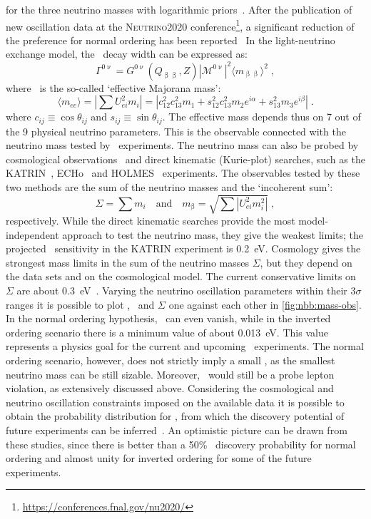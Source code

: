 for the three neutrino masses with logarithmic priors~\cite{Gariazzo2018}. After the
publication of new oscillation data at the \textsc{Neutrino2020}
conference\footnote{\url{https://conferences.fnal.gov/nu2020/}}, a significant reduction
of the preference for normal ordering has been reported~\cite{Kelly2020, Esteban2020}
\newpar
In the light-neutrino exchange model, the \onbb\ decay width can be expressed as:
\begin{equation}\label{eq:nbb:0nudecayrate}
  \Gamma^{0\upnu} = G^{0\upnu}(Q_{\upbeta\upbeta}, Z)
                  |\mathcal{M}^{0\upnu}|^2
                  \langle{m_{\upbeta\upbeta}}\rangle^2 \;,
\end{equation}
where \mbb\ is the so-called `effective Majorana mass':
\[
  \langle m_{ee} \rangle = \left| \sum U_{ei}^2 m_i \right|
                         = |c^2_{12} c^2_{13} m_1
                            + s^2_{12} c^2_{13} m_2 e^{i\alpha}
                            + s^2_{13} m_3 e^{i\beta}| \;.
\]
where $c_{ij} \equiv \cos{\theta_{ij}}$ and $s_{ij} \equiv \sin{\theta_{ij}}$.  The
effective mass depends thus on 7 out of the 9 physical neutrino parameters.  This is the
observable connected with the neutrino mass tested by \onbb\ experiments.  The neutrino
mass can also be probed by cosmological observations~\cite{Gerbino2018} and direct
kinematic (Kurie-plot) searches, such as the KATRIN~\cite{Aker2019},
ECHo~\cite{Gastaldo2018} and HOLMES~\cite{Alpert2014} experiments.  The observables tested
by these two methods are the sum of the neutrino masses and the `incoherent sum':
\[
  \Sigma = \sum m_i \quad \text{and} \quad m_{\upbeta}
         = \sqrt{\sum |U_{ei}^2 m_i^2|} \;,
\]
respectively. While the direct kinematic searches provide the most model-independent
approach to test the neutrino mass, they give the weakest limits; the projected \mb\
sensitivity in the KATRIN experiment is 0.2~eV.  Cosmology gives the strongest mass limits
in the sum of the neutrino masses $\Sigma$, but they depend on the data sets and on the
cosmological model. The current conservative limits on $\Sigma$ are about
0.3~eV~\cite{Aghanim2018}.
\newpar
Varying the neutrino oscillation parameters within their $3\sigma$ ranges it is possible
to plot \mbb, \mb\ and $\Sigma$ one against each other in \cref{fig:nbb:mass-obs}. In the
normal ordering hypothesis, \mbb\ can even vanish, while in the inverted ordering scenario
there is a minimum value of about 0.013~eV. This value represents a physics goal for the
current and upcoming \onbb\ experiments. The normal ordering scenario, however, does not
strictly imply a small \mbb, as the smallest neutrino mass can be still sizable. Moreover,
\onbb\ would still be a probe lepton violation, as extensively discussed above.
\newpar
Considering the cosmological and neutrino oscillation constraints imposed on the available
data it is possible to obtain the probability distribution for \mbb, from which the
discovery potential of future experiments can be inferred~\cite{Caldwell2017,
Agostini2017a, Ge2017}. An optimistic picture can be drawn from these studies, since there
is better than a 50\% \onbb\ discovery probability for normal ordering and almost unity
for inverted ordering for some of the future experiments.

